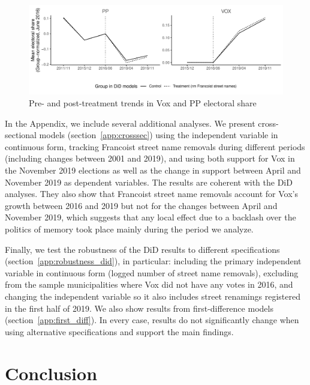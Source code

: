 \documentclass[12pt, titlepage]{article}
\begin{document}
\begin{figure}[htb!]
\centering

  \includegraphics[width = \textwidth]{img/par_trends_norm}

  \caption{Pre- and post-treatment trends in Vox and PP electoral share}\label{fig:par_trends_norm}

\end{figure}

In the Appendix, we include several additional analyses. We present cross-sectional models (section~\ref{app:crosssec}) using the independent variable in continuous form, tracking Francoist street name removals during different periods (including changes between 2001 and 2019), and using both support for Vox in the November 2019 elections as well as the change in support between April and November 2019 as dependent variables.
The results are coherent with the DiD analyses. They also show that Francoist street name removals account for Vox's growth between 2016 and 2019 but not for the changes between April and November 2019, which suggests that any local effect due to a backlash over the politics of memory took place mainly during the period we analyze.

Finally, we test the robustness of the DiD results to different specifications (section~\ref{app:robustness_did}), in particular: including the primary independent variable in continuous form (logged number of street name removals), excluding from the sample municipalities where Vox did not have any votes in 2016, and changing the independent variable so it also includes street renamings registered in the first half of 2019.
We also show results from first-difference models (section~\ref{app:first_diff}).
In every case, results do not significantly change when using alternative specifications and support the main findings.

\section*{Conclusion}
\end{document}

